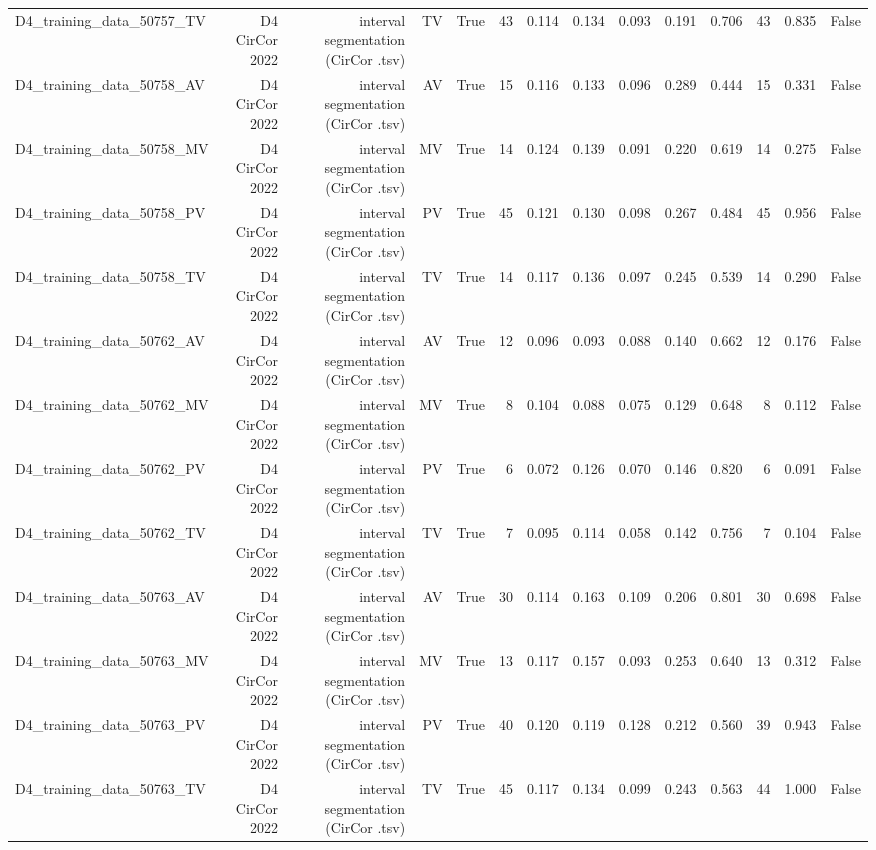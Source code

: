 \begin{table}[htbp]
\begin{tabular}{lrrrrrrrrrrrrr}
    D4\_training\_data\_50757\_TV & D4 CirCor 2022 & interval segmentation (CirCor .tsv) & TV & True & 43 & 0.114 & 0.134 & 0.093 & 0.191 & 0.706 & 43 & 0.835 & False \\
    D4\_training\_data\_50758\_AV & D4 CirCor 2022 & interval segmentation (CirCor .tsv) & AV & True & 15 & 0.116 & 0.133 & 0.096 & 0.289 & 0.444 & 15 & 0.331 & False \\
    D4\_training\_data\_50758\_MV & D4 CirCor 2022 & interval segmentation (CirCor .tsv) & MV & True & 14 & 0.124 & 0.139 & 0.091 & 0.220 & 0.619 & 14 & 0.275 & False \\
    D4\_training\_data\_50758\_PV & D4 CirCor 2022 & interval segmentation (CirCor .tsv) & PV & True & 45 & 0.121 & 0.130 & 0.098 & 0.267 & 0.484 & 45 & 0.956 & False \\
    D4\_training\_data\_50758\_TV & D4 CirCor 2022 & interval segmentation (CirCor .tsv) & TV & True & 14 & 0.117 & 0.136 & 0.097 & 0.245 & 0.539 & 14 & 0.290 & False \\
    D4\_training\_data\_50762\_AV & D4 CirCor 2022 & interval segmentation (CirCor .tsv) & AV & True & 12 & 0.096 & 0.093 & 0.088 & 0.140 & 0.662 & 12 & 0.176 & False \\
    D4\_training\_data\_50762\_MV & D4 CirCor 2022 & interval segmentation (CirCor .tsv) & MV & True & 8 & 0.104 & 0.088 & 0.075 & 0.129 & 0.648 & 8 & 0.112 & False \\
    D4\_training\_data\_50762\_PV & D4 CirCor 2022 & interval segmentation (CirCor .tsv) & PV & True & 6 & 0.072 & 0.126 & 0.070 & 0.146 & 0.820 & 6 & 0.091 & False \\
    D4\_training\_data\_50762\_TV & D4 CirCor 2022 & interval segmentation (CirCor .tsv) & TV & True & 7 & 0.095 & 0.114 & 0.058 & 0.142 & 0.756 & 7 & 0.104 & False \\
    D4\_training\_data\_50763\_AV & D4 CirCor 2022 & interval segmentation (CirCor .tsv) & AV & True & 30 & 0.114 & 0.163 & 0.109 & 0.206 & 0.801 & 30 & 0.698 & False \\
    D4\_training\_data\_50763\_MV & D4 CirCor 2022 & interval segmentation (CirCor .tsv) & MV & True & 13 & 0.117 & 0.157 & 0.093 & 0.253 & 0.640 & 13 & 0.312 & False \\
    D4\_training\_data\_50763\_PV & D4 CirCor 2022 & interval segmentation (CirCor .tsv) & PV & True & 40 & 0.120 & 0.119 & 0.128 & 0.212 & 0.560 & 39 & 0.943 & False \\
    D4\_training\_data\_50763\_TV & D4 CirCor 2022 & interval segmentation (CirCor .tsv) & TV & True & 45 & 0.117 & 0.134 & 0.099 & 0.243 & 0.563 & 44 & 1.000 & False \\

\end{tabular}
\end{table}
